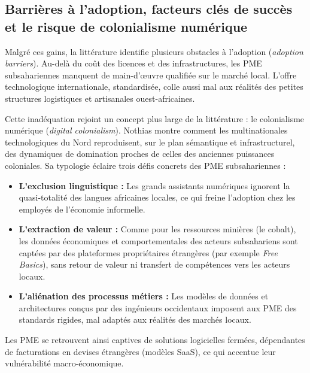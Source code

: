 \subsection{Barrières à l'adoption, facteurs clés de succès et le risque de colonialisme numérique}

Malgré ces gains, la littérature identifie plusieurs obstacles à l'adoption (\textit{adoption barriers}). Au-delà du coût des licences et des infrastructures, les PME subsahariennes manquent de main-d'œuvre qualifiée sur le marché local. L'offre technologique internationale, standardisée, colle aussi mal aux réalités des petites structures logistiques et artisanales ouest-africaines.

Cette inadéquation rejoint un concept plus large de la littérature : le colonialisme numérique (\textit{digital colonialism}). Nothias \cite{nothiasIntellectualHistoryDigital2025} montre comment les multinationales technologiques du Nord reproduisent, sur le plan sémantique et infrastructurel, des dynamiques de domination proches de celles des anciennes puissances coloniales. Sa typologie éclaire trois défis concrets des PME subsahariennes :
\begin{itemize}
    \item \textbf{L'exclusion linguistique :} Les grands assistants numériques ignorent la quasi-totalité des langues africaines locales, ce qui freine l'adoption chez les employés de l'économie informelle.
    \item \textbf{L'extraction de valeur :} Comme pour les ressources minières (le cobalt), les données économiques et comportementales des acteurs subsahariens sont captées par des plateformes propriétaires étrangères (par exemple \textit{Free Basics}), sans retour de valeur ni transfert de compétences vers les acteurs locaux.
    \item \textbf{L'aliénation des processus métiers :} Les modèles de données et architectures conçus par des ingénieurs occidentaux imposent aux PME des standards rigides, mal adaptés aux réalités des marchés locaux.
\end{itemize}

Les PME se retrouvent ainsi captives de solutions logicielles fermées, dépendantes de facturations en devises étrangères (modèles SaaS), ce qui accentue leur vulnérabilité macro-économique.

